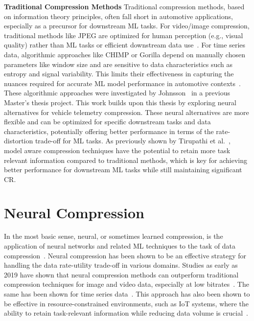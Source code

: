\textbf{Traditional Compression Methods} Traditional compression methods, based on information theory principles, often fall short in automotive applications, especially as a precursor for downstream ML tasks. For video/image compression, traditional methods like JPEG are optimized for human perception (e.g., visual quality) rather than ML tasks or efficient downstream data use~\cite[p.~12]{Ma2020}. For time series data, algorithmic approaches like CHIMP or Gorilla depend on manually chosen parameters like window size and are sensitive to data characteristics such as entropy and signal variability. This limits their effectiveness in capturing the nuances required for accurate ML model performance in automotive contexts~\cite[pp.~37--38 and 47]{Johnsson2025}. These algorithmic approaches were investigated by Johnsson~\cite{Johnsson2025} in a previous Master's thesis project. This work builds upon this thesis by exploring neural alternatives for vehicle telemetry compression. These neural alternatives are more flexible and can be optimized for specific downstream tasks and data characteristics, potentially offering better performance in terms of the rate-distortion trade-off for ML tasks. As previously shown by Tirupathi et al.~\cite{Tirupathi2022}, model aware compression techniques have the potential to retain more task relevant information compared to traditional methods, which is key for achieving better performance for downstream ML tasks while still maintaining significant CR. 

\section{Neural Compression}

In the most basic sense, neural, or sometimes learned compression, is the application of neural networks and related ML techniques to the task of data compression~\cite{Yang2022}. Neural compression has been shown to be an effective strategy for handling the data rate-utility trade-off in various domains. Studies as early as 2019 have shown that neural compression methods can outperform traditional compression techniques for image and video data, especially at low bitrates~\cite{Löhdefink2019}. The same has been shown for time series data~\cite{Zheng2023, Liu2024}. This approach has also been shown to be effective in resource-constrained environments, such as IoT systems, where the ability to retain task-relevant information while reducing data volume is crucial~\cite{Azar2022, Hodo2025}.

